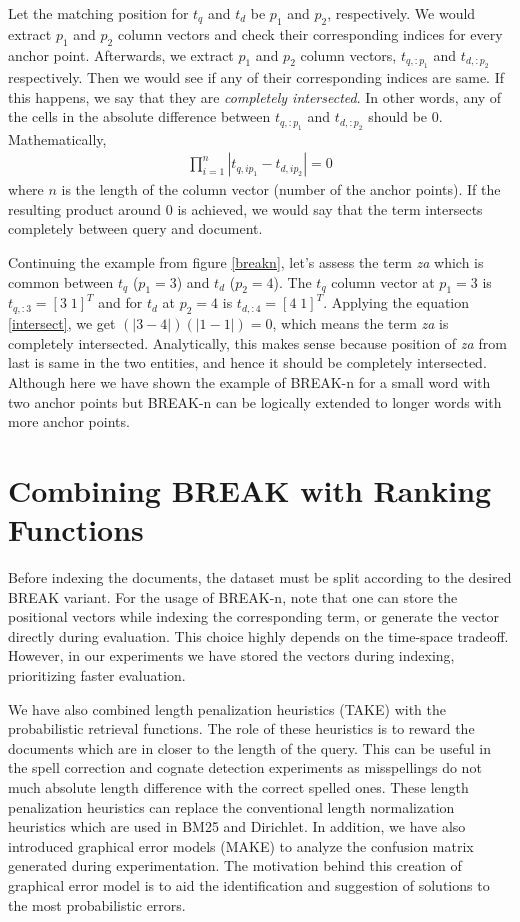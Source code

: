 Let the matching position for $t_q$ and $t_d$ be $p_1$ and $p_2$, respectively.
We would extract $p_1$ and $p_2$ column vectors and check their corresponding indices for every anchor point.
Afterwards, we extract $p_1$ and $p_2$ column vectors, $t_{q, :p_1}$ and $t_{d, :p_2}$ respectively.
Then we would see if any of their corresponding indices are same.
If this happens, we say that they are \textit{completely intersected}.
In other words, any of the cells in the absolute difference between $t_{q, :p_1}$ and $t_{d, :p_2}$ should be 0.
Mathematically,
\begin{align}
	\label{intersect}
	\prod_{i = 1}^{n} |t_{q, ip_1} - t_{d, ip_2}| = 0
\end{align}
where $n$ is the length of the column vector (number of the anchor points).
If the resulting product around 0 is achieved, we would say that the term intersects completely between query and document.

Continuing the example from figure \ref{breakn}, let's assess the term \textit{za} which is common between $t_q$ ($p_1 = 3$) and $t_d$ ($p_2 = 4$). 
The $t_q$ column vector at $p_1 = 3$ is $t_{q, :3} = [3 \; 1]^T$ and for $t_d$ at $p_2 = 4$ is $t_{d, :4} = [4 \; 1]^T$.
Applying the equation \ref{intersect}, we get $\left(|3 - 4|\right) \left(|1 - 1|\right) = 0$, which means the term \textit{za} is completely intersected.
Analytically, this makes sense because position of \textit{za} from last is same in the two entities, and hence it should be completely intersected.
Although here we have shown the example of BREAK-n for a small word with two anchor points but BREAK-n can be logically extended to longer words with more anchor points.

\section{Combining BREAK with Ranking Functions}
Before indexing the documents, the dataset must be split according to the desired BREAK variant.
For the usage of BREAK-n, note that one can store the positional vectors while indexing the corresponding term, or generate the vector directly during evaluation.
This choice highly depends on the time-space tradeoff.
However, in our experiments we have stored the vectors during indexing, prioritizing faster evaluation. 

We have also combined length penalization heuristics (TAKE) with the probabilistic retrieval functions. 
The role of these heuristics is to reward the documents which are in closer to the length of the query.
This can be useful in the spell correction and cognate detection experiments as misspellings do not much absolute length difference with the correct spelled ones.
These length penalization heuristics can replace the conventional length normalization heuristics which are used in BM25 and Dirichlet.
In addition, we have also introduced graphical error models (MAKE) to analyze the confusion matrix generated during experimentation. 
The motivation behind this creation of graphical error model is to aid the identification and suggestion of solutions to the most probabilistic errors.